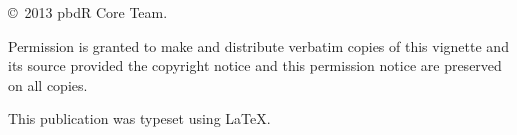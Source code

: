 \null
\vfill
\copyright\ 2013 pbdR Core Team.

Permission is granted to make and distribute verbatim copies of
this vignette and its source provided the copyright notice and
this permission notice are preserved on all copies.

This publication was typeset using \LaTeX.
